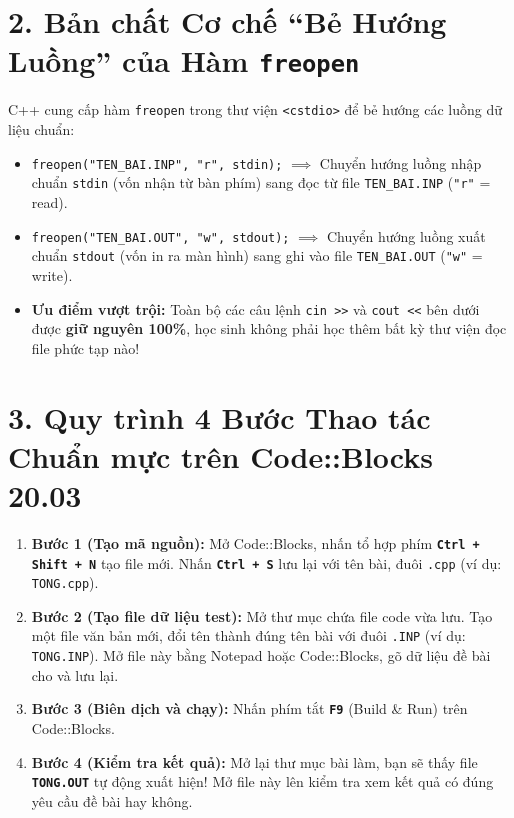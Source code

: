 \documentclass[11pt,a4paper]{article}
\begin{document}
\section*{\color{AsianDarkBlue}\normalsize 2. Bản chất Cơ chế ``Bẻ Hướng Luồng'' của Hàm \texttt{freopen}}
C++ cung cấp hàm \texttt{freopen} trong thư viện \texttt{<cstdio>} để bẻ hướng các luồng dữ liệu chuẩn:
\begin{itemize}
    \setlength{\itemsep}{1pt}
    \small
    \item \texttt{freopen("TEN\_BAI.INP", "r", stdin);} $\implies$ Chuyển hướng luồng nhập chuẩn \texttt{stdin} (vốn nhận từ bàn phím) sang đọc từ file \texttt{TEN\_BAI.INP} (\texttt{"r"} = read).
    \item \texttt{freopen("TEN\_BAI.OUT", "w", stdout);} $\implies$ Chuyển hướng luồng xuất chuẩn \texttt{stdout} (vốn in ra màn hình) sang ghi vào file \texttt{TEN\_BAI.OUT} (\texttt{"w"} = write).
    \item \textbf{Ưu điểm vượt trội:} Toàn bộ các câu lệnh \texttt{cin >>} và \texttt{cout <<} bên dưới được \textbf{giữ nguyên 100\%}, học sinh không phải học thêm bất kỳ thư viện đọc file phức tạp nào!
\end{itemize}

\vspace{-2mm}
\section*{\color{AsianDarkBlue}\normalsize 3. Quy trình 4 Bước Thao tác Chuẩn mực trên Code::Blocks 20.03}
\begin{enumerate}
    \setlength{\itemsep}{1.5pt}
    \small
    \item \textbf{Bước 1 (Tạo mã nguồn):} Mở Code::Blocks, nhấn tổ hợp phím \textbf{\texttt{Ctrl + Shift + N}} tạo file mới. Nhấn \textbf{\texttt{Ctrl + S}} lưu lại với tên bài, đuôi \texttt{.cpp} (ví dụ: \texttt{TONG.cpp}).
    \item \textbf{Bước 2 (Tạo file dữ liệu test):} Mở thư mục chứa file code vừa lưu. Tạo một file văn bản mới, đổi tên thành đúng tên bài với đuôi \texttt{.INP} (ví dụ: \texttt{TONG.INP}). Mở file này bằng Notepad hoặc Code::Blocks, gõ dữ liệu đề bài cho và lưu lại.
    \item \textbf{Bước 3 (Biên dịch và chạy):} Nhấn phím tắt \textbf{\texttt{F9}} (Build \& Run) trên Code::Blocks.
    \item \textbf{Bước 4 (Kiểm tra kết quả):} Mở lại thư mục bài làm, bạn sẽ thấy file \textbf{\texttt{TONG.OUT}} tự động xuất hiện! Mở file này lên kiểm tra xem kết quả có đúng yêu cầu đề bài hay không.
\end{enumerate}
\end{document}
